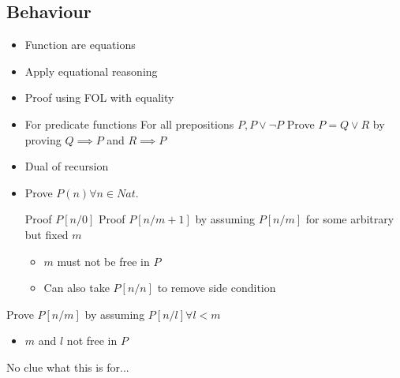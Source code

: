\subsection{Behaviour}
\begin{itemize}
        \begin{itemize}
            \item Function are equations
            \item Apply equational reasoning
            \item Proof using FOL with equality
        \end{itemize}
        \begin{itemize}
            \item For predicate functions
             For all prepositions $P, P \lor \neg P$
             Prove $P = Q \lor R$ by proving $Q \implies P$ and $R \implies P$
        \end{itemize}
        \begin{itemize}
            \item Dual of recursion
            \item Prove $P(n) \forall n \in Nat.$


             Proof $P[n/0]$
             Proof $P[n/ m + 1]$ by assuming $P[n / m]$ for some arbitrary but fixed $m$
                \begin{itemize}
                    \item $m$ must not be free in $P$
                    \item Can also take $P[n/n]$ to remove side condition
                \end{itemize}
        \end{itemize}
        \begin{itemize}
             Prove $P[n/m]$ by assuming $P[n/l] \forall l < m$
                \begin{itemize}
                    \item $m$ and $l$ not free in $P$
                \end{itemize}
             No clue what this is for...
        \end{itemize}
\end{itemize}
